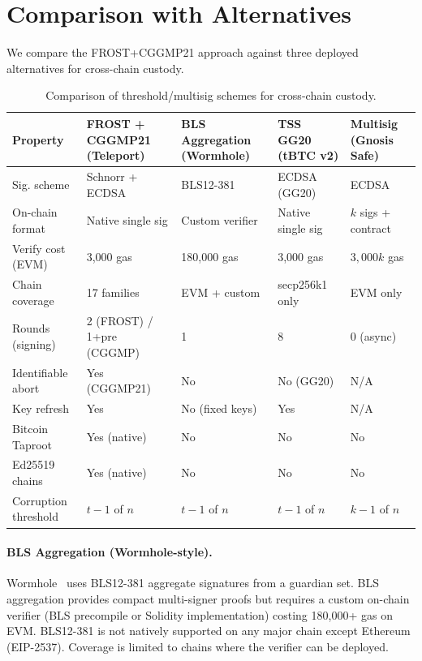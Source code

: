\section{Comparison with Alternatives}

\label{sec:comparison}

We compare the FROST+CGGMP21 approach against three deployed alternatives for
cross-chain custody.

\begin{table}[t]
\centering
\small
\begin{tabular}{@{}p{2.8cm}p{2.5cm}p{2.5cm}p{2.5cm}p{2.5cm}@{}}
\toprule
\textbf{Property} & \textbf{FROST + CGGMP21} (Teleport) & \textbf{BLS Aggregation} (Wormhole) & \textbf{TSS GG20} (tBTC v2) & \textbf{Multisig} (Gnosis Safe) \\
\midrule
Sig. scheme & Schnorr + ECDSA & BLS12-381 & ECDSA (GG20) & ECDSA \\
On-chain format & Native single sig & Custom verifier & Native single sig & $k$ sigs + contract \\
Verify cost (EVM) & 3,000 gas & 180,000 gas & 3,000 gas & $3{,}000k$ gas \\
Chain coverage & 17 families & EVM + custom & secp256k1 only & EVM only \\
Rounds (signing) & 2 (FROST) / 1+pre (CGGMP) & 1 & 8 & 0 (async) \\
Identifiable abort & Yes (CGGMP21) & No & No (GG20) & N/A \\
Key refresh & Yes & No (fixed keys) & Yes & N/A \\
Bitcoin Taproot & Yes (native) & No & No & No \\
Ed25519 chains & Yes (native) & No & No & No \\
Corruption threshold & $t{-}1$ of $n$ & $t{-}1$ of $n$ & $t{-}1$ of $n$ & $k{-}1$ of $n$ \\
\bottomrule
\end{tabular}
\caption{Comparison of threshold/multisig schemes for cross-chain custody.}
\label{tab:comparison}
\end{table}

\paragraph{BLS Aggregation (Wormhole-style).}
Wormhole~\cite{wormhole2023} uses BLS12-381 aggregate signatures from a guardian set.
BLS aggregation provides compact multi-signer proofs but requires a custom on-chain
verifier (BLS precompile or Solidity implementation) costing 180,000+ gas on EVM.
BLS12-381 is not natively supported on any major chain except Ethereum (EIP-2537).
Coverage is limited to chains where the verifier can be deployed.


